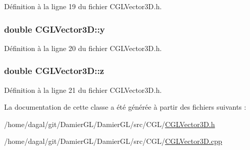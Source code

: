 Définition à la ligne 19 du fichier C\-G\-L\-Vector3\-D.\-h.

\hypertarget{class_c_g_l_vector3_d_aa0214242c06021e0e1fdc3abaf99656d}{
\subsubsection[{y}]{\setlength{\rightskip}{0pt plus 5cm}double C\-G\-L\-Vector3\-D\-::y\hspace{0.3cm}{\ttfamily [protected]}}}\label{class_c_g_l_vector3_d_aa0214242c06021e0e1fdc3abaf99656d}


Définition à la ligne 20 du fichier C\-G\-L\-Vector3\-D.\-h.

\hypertarget{class_c_g_l_vector3_d_af16926d21ef4bddbc2524d2604e049b3}{
\subsubsection[{z}]{\setlength{\rightskip}{0pt plus 5cm}double C\-G\-L\-Vector3\-D\-::z\hspace{0.3cm}{\ttfamily [protected]}}}\label{class_c_g_l_vector3_d_af16926d21ef4bddbc2524d2604e049b3}


Définition à la ligne 21 du fichier C\-G\-L\-Vector3\-D.\-h.



La documentation de cette classe a été générée à partir des fichiers suivants \-:\begin{DoxyCompactItemize}
\item 
/home/dagal/git/\-Damier\-G\-L/\-Damier\-G\-L/src/\-C\-G\-L/\hyperlink{_c_g_l_vector3_d_8h}{C\-G\-L\-Vector3\-D.\-h}\item 
/home/dagal/git/\-Damier\-G\-L/\-Damier\-G\-L/src/\-C\-G\-L/\hyperlink{_c_g_l_vector3_d_8cpp}{C\-G\-L\-Vector3\-D.\-cpp}\end{DoxyCompactItemize}
